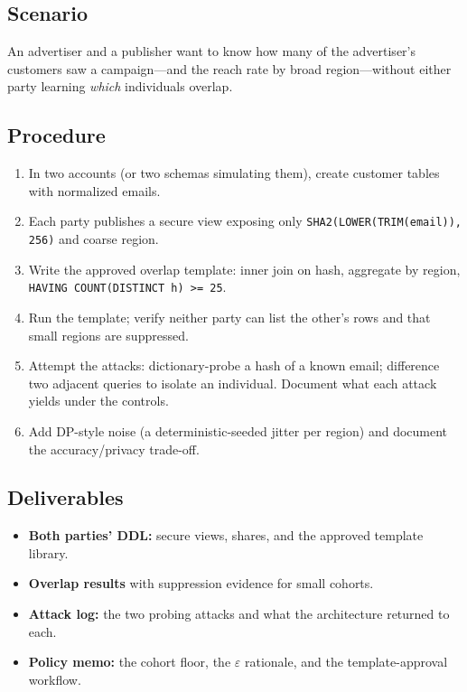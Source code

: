 \subsection*{Scenario}
An advertiser and a publisher want to know how many of the advertiser's customers saw a campaign---and the reach rate by broad region---without either party learning \emph{which} individuals overlap.

\subsection*{Procedure}
\begin{enumerate}
    \item In two accounts (or two schemas simulating them), create customer tables with normalized emails.
    \item Each party publishes a secure view exposing only \texttt{SHA2(LOWER(TRIM(email)), 256)} and coarse region.
    \item Write the approved overlap template: inner join on hash, aggregate by region, \texttt{HAVING COUNT(DISTINCT h) >= 25}.
    \item Run the template; verify neither party can list the other's rows and that small regions are suppressed.
    \item Attempt the attacks: dictionary-probe a hash of a known email; difference two adjacent queries to isolate an individual. Document what each attack yields under the controls.
    \item Add DP-style noise (a deterministic-seeded jitter per region) and document the accuracy/privacy trade-off.
\end{enumerate}

\subsection*{Deliverables}
\begin{itemize}
    \item \textbf{Both parties' DDL:} secure views, shares, and the approved template library.
    \item \textbf{Overlap results} with suppression evidence for small cohorts.
    \item \textbf{Attack log:} the two probing attacks and what the architecture returned to each.
    \item \textbf{Policy memo:} the cohort floor, the $\varepsilon$ rationale, and the template-approval workflow.
\end{itemize}

